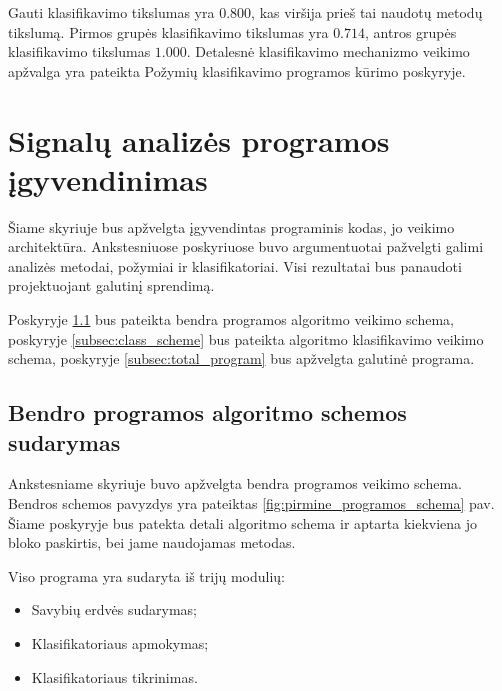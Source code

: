 \documentclass[]{vgtuef}
\begin{document}
Gauti klasifikavimo tikslumas yra $0.800$, kas viršija prieš tai naudotų metodų tikslumą. Pirmos grupės klasifikavimo tikslumas yra $0.714$, antros grupės klasifikavimo tikslumas $1.000$. Detalesnė klasifikavimo mechanizmo veikimo apžvalga yra pateikta Požymių klasifikavimo programos kūrimo poskyryje.

\section{Signalų analizės programos įgyvendinimas}

Šiame skyriuje bus apžvelgta įgyvendintas programinis kodas, jo veikimo architektūra. Ankstesniuose poskyriuose buvo argumentuotai pažvelgti galimi analizės metodai, požymiai ir klasifikatoriai. Visi rezultatai bus panaudoti projektuojant galutinį sprendimą.

Poskyryje \ref{subsec:total_scheme} bus pateikta bendra programos algoritmo veikimo schema, poskyryje \ref{subsec:class_scheme} bus pateikta algoritmo klasifikavimo veikimo schema, poskyryje \ref{subsec:total_program} bus apžvelgta galutinė programa.

\subsection{Bendro programos algoritmo schemos sudarymas}
\label{subsec:total_scheme}

Ankstesniame skyriuje buvo apžvelgta bendra programos veikimo schema. Bendros schemos pavyzdys yra pateiktas \ref{fig:pirmine_programos_schema} pav. Šiame  poskyryje bus patekta detali algoritmo schema ir aptarta kiekviena jo bloko paskirtis, bei jame naudojamas metodas.

Viso programa yra sudaryta iš trijų modulių:

\begin{itemize}
\item Savybių erdvės sudarymas;
\item Klasifikatoriaus apmokymas;
\item Klasifikatoriaus tikrinimas.
\end{itemize}
\end{document}
